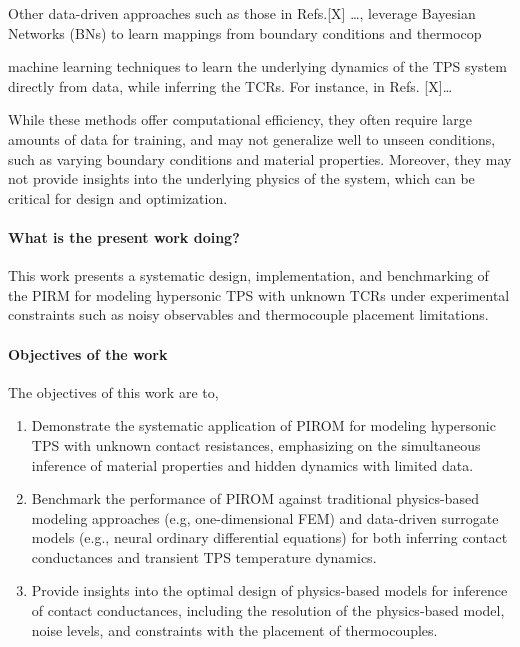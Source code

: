 Other data-driven approaches such as those in Refs.[X] \dots, leverage Bayesian Networks (BNs) to learn mappings from boundary conditions and thermocop

machine learning techniques to learn the underlying dynamics of the TPS system directly from data, while inferring the TCRs. For instance, in Refs. [X]\dots

While these methods offer computational efficiency, they often require large amounts of data for training, and may not generalize well to unseen conditions, such as varying boundary conditions and material properties. Moreover, they may not provide insights into the underlying physics of the system, which can be critical for design and optimization.

\paragraph{What is the present work doing?} This work presents a systematic design, implementation, and benchmarking of the PIRM for modeling hypersonic TPS with unknown TCRs under experimental constraints such as noisy observables and thermocouple placement limitations. 


\paragraph{Objectives of the work} The objectives of this work are to,
\begin{enumerate}
    \item Demonstrate the systematic application of PIROM for modeling hypersonic TPS with unknown contact resistances, emphasizing on the simultaneous inference of material properties and hidden dynamics with limited data.
    \item Benchmark the performance of PIROM against traditional physics-based modeling approaches (e.g, one-dimensional FEM) and data-driven surrogate models (e.g., neural ordinary differential equations) for both inferring contact conductances and transient TPS temperature dynamics.
    \item Provide insights into the optimal design of physics-based models for inference of contact conductances, including the resolution of the physics-based model, noise levels, and constraints with the placement of thermocouples.
\end{enumerate}